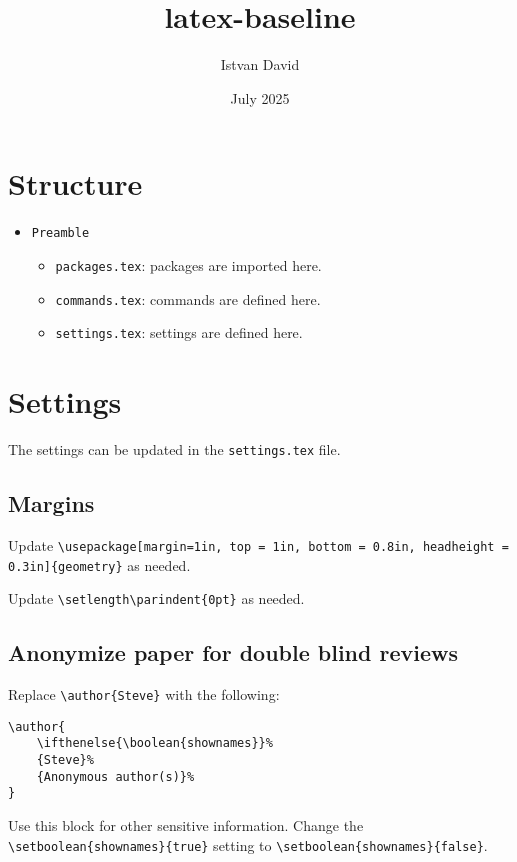 \documentclass{article}
\title{latex-baseline}
\author{Istvan David}
\date{July 2025}
\begin{document}


\maketitle

\section{Structure}
\begin{itemize}
    \item \verb|Preamble|
    \begin{itemize}
        \item \verb|packages.tex|: packages are imported here.
        \item \verb|commands.tex|: commands are defined here.
        \item \verb|settings.tex|: settings are defined here.
    \end{itemize}
\end{itemize}

\section{Settings}

The settings can be updated in the \verb|settings.tex| file.

\subsection{Margins}
Update \verb|\usepackage[margin=1in, top = 1in, bottom = 0.8in, headheight = 0.3in]{geometry}| as needed.

Update \verb|\setlength\parindent{0pt}| as needed.


\subsection{Anonymize paper for double blind reviews}
Replace \verb|\author{Steve}| with the following:
\begin{verbatim}
\author{
    \ifthenelse{\boolean{shownames}}%
    {Steve}%
    {Anonymous author(s)}%
}
\end{verbatim}

Use this block for other sensitive information. Change the \verb|\setboolean{shownames}{true}| setting to \verb|\setboolean{shownames}{false}|.
\end{document}
